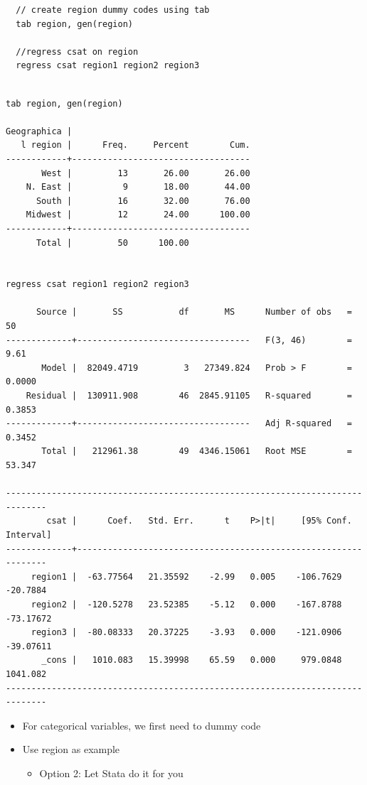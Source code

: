 \documentclass[]{book}
\providecommand{\tightlist}{%
  \setlength{\itemsep}{0pt}\setlength{\parskip}{0pt}}
\begin{document}
\begin{verbatim}
  // create region dummy codes using tab 
  tab region, gen(region)

  //regress csat on region
  regress csat region1 region2 region3
\end{verbatim}

\begin{verbatim}

tab region, gen(region)

Geographica |
   l region |      Freq.     Percent        Cum.
------------+-----------------------------------
       West |         13       26.00       26.00
    N. East |          9       18.00       44.00
      South |         16       32.00       76.00
    Midwest |         12       24.00      100.00
------------+-----------------------------------
      Total |         50      100.00


regress csat region1 region2 region3

      Source |       SS           df       MS      Number of obs   =        50
-------------+----------------------------------   F(3, 46)        =      9.61
       Model |  82049.4719         3   27349.824   Prob > F        =    0.0000
    Residual |  130911.908        46  2845.91105   R-squared       =    0.3853
-------------+----------------------------------   Adj R-squared   =    0.3452
       Total |   212961.38        49  4346.15061   Root MSE        =    53.347

------------------------------------------------------------------------------
        csat |      Coef.   Std. Err.      t    P>|t|     [95% Conf. Interval]
-------------+----------------------------------------------------------------
     region1 |  -63.77564   21.35592    -2.99   0.005    -106.7629    -20.7884
     region2 |  -120.5278   23.52385    -5.12   0.000    -167.8788   -73.17672
     region3 |  -80.08333   20.37225    -3.93   0.000    -121.0906   -39.07611
       _cons |   1010.083   15.39998    65.59   0.000     979.0848    1041.082
------------------------------------------------------------------------------
\end{verbatim}

\begin{itemize}
\tightlist
\item
  For categorical variables, we first need to dummy code
\item
  Use region as example

  \begin{itemize}
  \tightlist
  \item
    Option 2: Let Stata do it for you
  \end{itemize}
\end{itemize}
\end{document}

